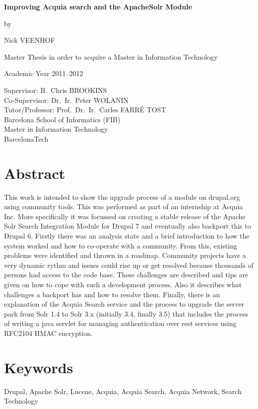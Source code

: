 
\newpage

{
\setlength{\baselineskip}{14pt}
\setlength{\parindent}{0pt}
\setlength{\parskip}{8pt}

\begin{center}

\noindent \textbf{\huge Improving Acquia search and the ApacheSolr Module\\[8pt]}


by 

Nick VEENHOF

Master Thesis in order to acquire a Master in Information Technology

Academic Year 2011--2012

Supervisor: B.~Chris BROOKINS\\
Co-Supervisor: Dr.~Ir.~Peter WOLANIN\\
Tutor/Professor: Prof.~Dr.~Ir.~Carles FARR\'{E} TOST\\

Barcelona School of Informatics (FIB)\\
Master in Information Technology\\
BarcelonaTech

\end{center}

\section*{Abstract}


This work is intended to show the upgrade process of a module on drupal.org using community tools. This was performed as part of an internship at Acquia Inc. More specifically it was focussed on creating a stable release of the Apache Solr Search Integration Module for Drupal 7 and eventually also backport this to Drupal 6. 
Firstly there was  an analysis state and a brief introduction to how the system worked and how to co-operate with a community. From this, existing problems were identified and thrown in a roadmap. Community projects have a very dynamic rythm and issues could rise up or get resolved because thousands of persons had access to the code base. These challenges are described and tips are given on how to cope with such a development process.
Also it describes what challenges a backport has and how to resolve them. 
Finally, there is an explanation of the Acquia Search service and the process to upgrade the server park from Solr 1.4 to Solr 3.x (initially 3.4, finally 3.5) that includes the process of writing a java servlet for managing authentication over rest services using RFC2104 HMAC encryption.

\section*{Keywords}
Drupal, Apache Solr, Lucene, Acquia, Acquia Search, Acquia Network, Search Technology
}

\newpage %
